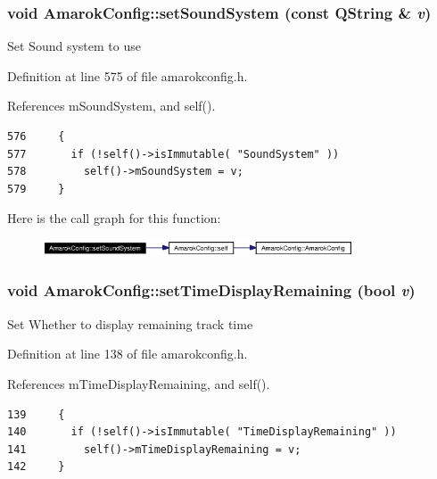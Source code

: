 \subsubsection{\setlength{\rightskip}{0pt plus 5cm}void Amarok\-Config::set\-Sound\-System (const QString \& {\em v})\hspace{0.3cm}{\tt  [inline, static]}}\label{classAmarokConfig_AmarokConfige59}


Set Sound system to use 

Definition at line 575 of file amarokconfig.h.

References m\-Sound\-System, and self().



\footnotesize\begin{verbatim}576     {
577       if (!self()->isImmutable( "SoundSystem" ))
578         self()->mSoundSystem = v;
579     }
\end{verbatim}\normalsize 


Here is the call graph for this function:\begin{figure}[H]
\begin{center}
\leavevmode
\includegraphics[width=261pt]{classAmarokConfig_AmarokConfige59_cgraph}
\end{center}
\end{figure}
\subsubsection{\setlength{\rightskip}{0pt plus 5cm}void Amarok\-Config::set\-Time\-Display\-Remaining (bool {\em v})\hspace{0.3cm}{\tt  [inline, static]}}\label{classAmarokConfig_AmarokConfige13}


Set Whether to display remaining track time 

Definition at line 138 of file amarokconfig.h.

References m\-Time\-Display\-Remaining, and self().



\footnotesize\begin{verbatim}139     {
140       if (!self()->isImmutable( "TimeDisplayRemaining" ))
141         self()->mTimeDisplayRemaining = v;
142     }
\end{verbatim}\normalsize 


